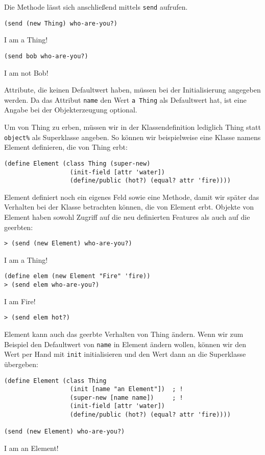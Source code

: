 Die Methode lässt sich anschließend mittels \texttt{send} aufrufen.

\begin{lstlisting}
(send (new Thing) who-are-you?)
\end{lstlisting}
{\routput {\qq}I am a Thing!{\qq}}

\begin{lstlisting}
(send bob who-are-you?)
\end{lstlisting}
{\routput {\qq}I am not Bob!{\qq}}

Attribute, die keinen Defaultwert haben, müssen bei der Initialisierung angegeben werden. Da das Attribut \texttt{name} den Wert  \texttt{{\qq}a Thing{\qq}} als Defaultwert hat, ist eine Angabe bei der Objekterzeugung optional. 

Um von Thing zu erben, müssen wir in der Klassendefinition lediglich Thing statt \texttt{object\%} als Superklasse angeben. So können wir beispielweise eine Klasse namens Element definieren, die von Thing erbt:

\begin{lstlisting}
(define Element (class Thing (super-new)
                  (init-field [attr 'water])
                  (define/public (hot?) (equal? attr 'fire))))
\end{lstlisting}

Element definiert noch ein eigenes Feld sowie eine Methode, damit wir später das Verhalten bei der Klasse betrachten können, die von Element erbt. Objekte von Element haben sowohl Zugriff auf die neu definierten Features als auch auf die geerbten:

\begin{lstlisting}
> (send (new Element) who-are-you?)
\end{lstlisting}
{\routput {\qq}I am a Thing!\qq}

\begin{lstlisting}
(define elem (new Element "Fire" 'fire))
> (send elem who-are-you?)
\end{lstlisting} 
{\routput {\qq}I am Fire!\qq}
\begin{lstlisting}
> (send elem hot?)
\end{lstlisting} 
{}

Element kann auch das geerbte Verhalten von Thing ändern. Wenn wir zum Beispiel den Defaultwert von \texttt{name} in Element ändern wollen, können wir den Wert per Hand mit \texttt{init} initialisieren und den Wert dann an die Superklasse übergeben:

\begin{lstlisting}
(define Element (class Thing 
                  (init [name "an Element"])  ; !
                  (super-new [name name])     ; !
                  (init-field [attr 'water])
                  (define/public (hot?) (equal? attr 'fire))))
  
(send (new Element) who-are-you?)
\end{lstlisting}
{\routput {\qq}I am an Element!\qq}

